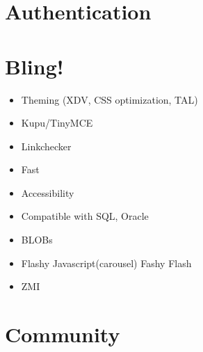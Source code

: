\documentclass[arial,pdftex]{beamer}
\begin{document}

\section{Authentication}


\section{Bling!}
\begin{frame}
  \begin{itemize}
    \pause \item Theming (XDV, CSS optimization, TAL)
    \pause \item Kupu/TinyMCE
    \pause \item Linkchecker
    \pause \item Fast
    \pause \item Accessibility
    \pause \item Compatible with SQL, Oracle
    \pause \item BLOBs
    \pause \item Flashy Javascript(carousel) Fashy Flash
    \pause \item ZMI
  \end{itemize}
\end{frame}

\section{Community}

\end{document}
